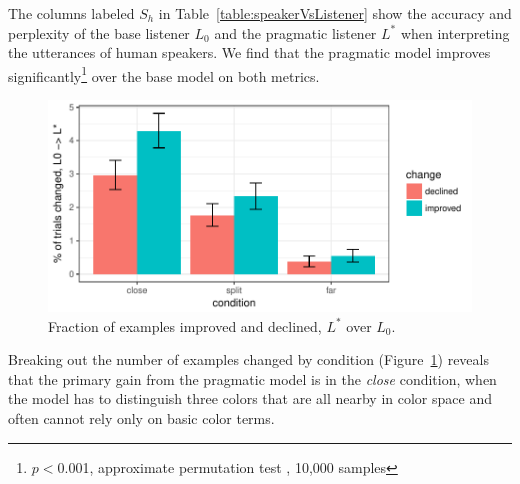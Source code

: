 \documentclass[11pt,letterpaper]{article}
\newcommand{\Listener}{L}
\newcommand{\Speaker}{S}
\renewcommand{\|}{\mid}
\newcommand{\figref}[1]{Figure~\ref{#1}}
\newcommand{\tabref}[1]{Table~\ref{#1}}
\newcommand{\cond}{\emph}
\begin{document}
The columns labeled $\Speaker_h$ in \tabref{table:speakerVsListener} show the accuracy
and perplexity of the base listener $\Listener_0$ and the pragmatic listener
$\Listener^*$ when interpreting the utterances of human speakers. We find that the
pragmatic model improves significantly\footnote{$p <{}$0.001, approximate
permutation test \cite{Pado2006}, 10,000 samples} over the base model on both metrics.

\begin{figure}
\centering
\includegraphics[scale = .45]{figures/changedByCondition.pdf}
\caption{Fraction of examples improved and declined, $\Listener^*$ over $\Listener_0$.}
\label{fig:changedByCondition}
\end{figure}

Breaking out the number of examples changed by condition
(\figref{fig:changedByCondition}) reveals that
the primary gain from the pragmatic model is in the \cond{close} condition, when the
model has to distinguish three colors that are all nearby in color space and
often cannot rely only on basic color terms.
\end{document}
